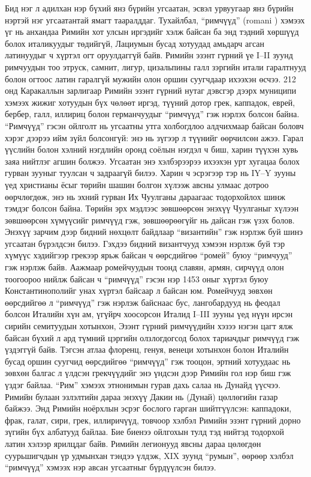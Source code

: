 Бид нэг л адилхан нэр бүхий янз бүрийн угсаатан, эсвэл урвуугаар янз бүрийн нэртэй нэг угсаатантай ямагт тааралддаг. Тухайлбал, “римчүүд” (romani ) хэмээх үг нь анхандаа Римийн хот улсын иргэдийг хэлж байсан ба энд тэдний хөршүүд болох италикуудыг төдийгүй, Лациумын бусад хотуудад амьдарч агсан латинуудыг ч хүртэл огт оруулдаггүй байв. Римийн эзэнт гүрний үе I–II зуунд римчуудын тоо этруск, самнит, лигур, цизальпины галл зэргийн итали гаралтнууд болон огтоос латин гаралгүй мужийн олон оршин суугчдаар ихээхэн өсчээ. 212 онд Каракаллын зарлигаар Римийн эзэнт гүрний нутаг дэвсгэр дээрх муниципи хэмээх жижиг хотуудын бүх чөлөөт иргэд, түүний дотор грек, каппадок, еврей, бербер, галл, иллириц болон германчуудыг “римчүүд” гэж нэрлэх болсон байна. “Римчүүд” гэсэн ойлголт нь угсаатны утга холбогдлоо алдчихмаар байсан боловч хэрэг дээрээ ийм зүйл болсонгүй: энэ нь зүгээр л түүнийг өөрчилсөн ажээ. Гарал үүслийн болон хэлний нэгдлийн оронд соёлын нэгдэл ч биш, харин түүхэн хувь заяа нийтлэг агшин болжээ. Угсаатан энэ хэлбэрээрээ ихээхэн урт хугацаа болох гурван зууныг туулсан ч задраагүй билээ. Харин ч эсрэгээр тэр нь IY–Y зууны үед христианы ёсыг төрийн шашин болгон хүлээж авсны улмаас дотроо өөрчлөгдөж, энэ нь эхний гурван Их Чуулганы дараагаас тодорхойлох шинж тэмдэг болсон байна. Төрийн эрх мэдлээс зөвшөөрсөн энэхүү Чуулганыг хүлээн зөвшөөрсөн хүмүүсийг римчүүд гэж, зөвшөөрөөгүйг нь дайсан гэж үзэх болов. Энэхүү зарчим дээр бидний нөхцөлт байдлаар “византийн” гэж нэрлэж буй шинэ угсаатан бүрэлдсэн билээ. Гэхдээ бидний византчууд хэмээн нэрлэж буй тэр хүмүүс хэдийгээр грекээр ярьж байсан ч өөрсдийгөө “ромей” буюу “римчууд” гэж нэрлэж байв. Аажмаар ромейчуудын тоонд славян, армян, сирчүүд олон тоогоороо нийлж байсан ч “римчүүд” гэсэн нэр 1453 оныг хүртэл буюу Константинополийг унах хүртэл байсаар л байсан юм. Ромейчууд зөвхөн өөрсдийгөө л “римчүүд” гэж нэрлэж байснаас бус, лангобардууд нь феодал болсон Италийн хүн ам, үгүйрч хоосорсон Италид I–III зууны үед нүүн ирсэн сирийн семитуудын хотынхон, Эзэнт гүрний римчүүдийн хэзээ нэгэн цагт ялж байсан бүхий л ард түмний цэргийн олзлогдогсод болох тариачдыг римчүүд гэж үздэггүй байв. Тэгсэн атлаа флоренц, генуя, венеци хотынхон болон Италийн бусад оршин суугчид өөрсдийгөө “римчүүд” гэж тооцон, эртний хотуудаас нь зөвхөн балгас л үлдсэн грекчүүдийг энэ үндсэн дээр Римийн гол нэр биш гэж үздэг байлаа.
“Рим” хэмээх этнонимын гурав дахь салаа нь Дунайд үүсчээ. Римийн булаан эзлэлтийн дараа энэхүү Дакии нь (Дунай) цөллөгийн газар байжээ. Энд Римийн ноёрхлын эсрэг бослого гарган шийтгүүлсэн: каппадоки, фрак, галат, сири, грек, иллиричүүд, товчоор хэлбэл Римийн эзэнт гүрний дорно зүгийн бүх албатууд байлаа. Бие биенээ ойлгохын тулд тэд нийтэд тодорхой латин хэлээр ярилцдаг байв. Римийн легионууд явсны дараа цөлөгдөн суурьшигчдын үр удмынхан тэндээ үлдэж, XIX зуунд “румын”, өөрөөр хэлбэл “римчүүд” хэмээх нэр авсан угсаатныг бүрдүүлсэн билээ.
